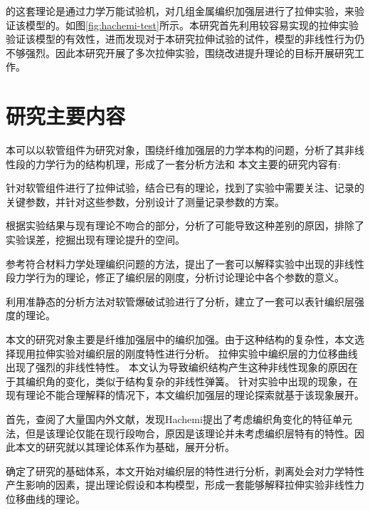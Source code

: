 \citeauthor{Hachemi2011}的这套理论是通过力学万能试验机，对几组金属编织加强层进行了拉伸实验，来验证该模型的。如图\ref{fig:hachemi-test}所示。本研究首先利用较容易实现的拉伸实验验证该模型的有效性，进而发现对于本研究拉伸试验的试件，\ha 模型的非线性行为仍不够强烈。因此本研究开展了多次拉伸实验，围绕改进提升\ha 理论的目标开展研究工作。




 











\section{研究主要内容}
本可以以软管组件为研究对象，围绕纤维加强层的力学本构的问题，分析了其非线性段的力学行为的结构机理，形成了一套分析方法和
本文主要的研究内容有:
\begin{asparaenum}
	\item 针对软管组件进行了拉伸试验，结合已有的理论，找到了实验中需要关注、记录的关键参数，并针对这些参数，分别设计了测量记录参数的方案。
	\item 根据实验结果与现有理论不吻合的部分，分析了可能导致这种差别的原因，排除了实验误差，挖掘出现有理论提升的空间。
	\item 参考符合材料力学处理编织问题的方法，提出了一套可以解释实验中出现的非线性段力学行为的理论，修正了编织层的刚度，分析讨论理论中各个参数的意义。
	 \item 
	利用准静态的分析方法对软管爆破试验进行了分析，建立了一套可以表针编织层强度的理论。
\end{asparaenum}

本文的研究对象主要是纤维加强层中的编织加强。由于这种结构的复杂性，本文选择现用拉伸实验对编织层的刚度特性进行分析。
拉伸实验中编织层的力位移曲线出现了强烈的非线性特性。
本文认为导致编织结构产生这种非线性现象的原因在于其编织角的变化，类似于结构复杂的非线性弹簧。
针对实验中出现的现象，在现有理论不能合理解释的情况下，本文编织加强层的理论探索就基于该现象展开。


首先，查阅了大量国内外文献，发现Hachemi提出了考虑编织角变化的特征单元法，但是该理论仅能在现行段吻合，原因是该理论并未考虑编织层特有的特性。因此本文的研究就以其理论体系作为基础，展开分析。

确定了研究的基础体系，本文开始对编织层的特性进行分析，剥离处会对力学特性产生影响的因素，提出理论假设和本构模型，形成一套能够解释拉伸实验非线性力位移曲线的理论。

